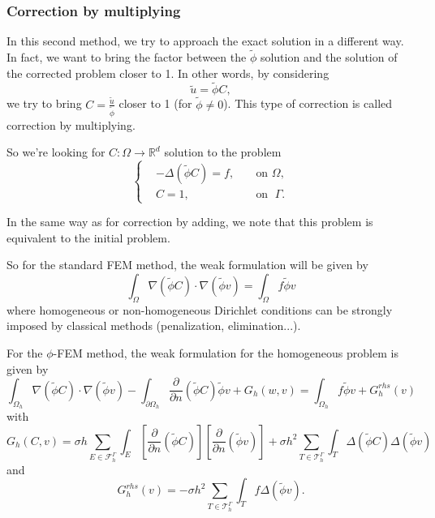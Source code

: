 \subsubsection{Correction by multiplying} \label{Corr.method.mult}

In this second method, we try to approach the exact solution in a different way. In fact, we want to bring the factor between the $\tilde{\phi}$ solution and the solution of the corrected problem closer to 1. In other words, by considering 
\begin{equation*}
	\tilde{u}=\tilde{\phi}C,
\end{equation*}
we try to bring $C=\frac{\tilde{u}}{\tilde{\phi}}$ closer to 1 (for $\tilde{\phi}\ne 0$). This type of correction is called correction by multiplying.

So we're looking for $C: \Omega \rightarrow \mathbb{R}^d$ solution to the problem
\begin{equation*}
	\left\{\begin{aligned}
		&-\Delta (\tilde{\phi}C)=f, \; &&\text{on } \Omega, \\
		&C=1, \; &&\text{on } \; \Gamma.
	\end{aligned}\right. %
\end{equation*}

\begin{Rem}
	In the same way as for correction by adding, we note that this problem is equivalent to the initial problem.
\end{Rem}

So for the standard FEM method, the weak formulation will be given by
\begin{equation*}
	\int_\Omega \nabla (\tilde{\phi}C)\cdot\nabla (\tilde{\phi}v)=\int_\Omega f\tilde{\phi}v
\end{equation*}
where homogeneous or non-homogeneous Dirichlet conditions can be strongly imposed by classical methods (penalization, elimination...).

For the $\phi$-FEM method, the weak formulation for the homogeneous problem is given by
\begin{equation*}
	\int_{\Omega_h} \nabla (\tilde{\phi} C) \cdot \nabla (\tilde{\phi} v) - \int_{\partial\Omega_h} \frac{\partial}{\partial n}(\tilde{\phi} C)\tilde{\phi} v+G_h(w,v)=\int_{\Omega_h} f \tilde{\phi} v + G_h^{rhs}(v)
\end{equation*}
with
\begin{equation*}
	G_h(C,v)=\sigma h\sum_{E\in\mathcal{F}_h^\Gamma} \int_E \left[\frac{\partial}{\partial n}(\tilde{\phi} C)\right] \left[\frac{\partial}{\partial n}(\tilde{\phi} v)\right]+\sigma h^2\sum_{T\in\mathcal{T}_h^\Gamma} \int_{T} \Delta(\tilde{\phi} C)\Delta(\tilde{\phi} v)
\end{equation*}
and
\begin{equation*}
	G_h^{rhs}(v)=-\sigma h^2\sum_{T\in\mathcal{T}_h^\Gamma} \int_{T} f \Delta(\tilde{\phi} v).
\end{equation*}

